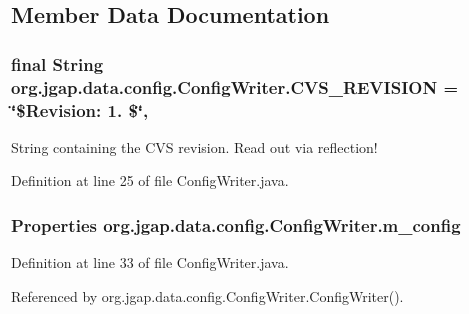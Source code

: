\subsection{Member Data Documentation}
\hypertarget{classorg_1_1jgap_1_1data_1_1config_1_1_config_writer_aacfdf9dc14ce9c848b420f51618c7a22}{
\subsubsection[{C\-V\-S\-\_\-\-R\-E\-V\-I\-S\-I\-O\-N}]{\setlength{\rightskip}{0pt plus 5cm}final String org.\-jgap.\-data.\-config.\-Config\-Writer.\-C\-V\-S\-\_\-\-R\-E\-V\-I\-S\-I\-O\-N = \char`\"{}\$Revision\-: 1. \$\char`\"{}\hspace{0.3cm}{\ttfamily [static]}, {\ttfamily [private]}}}\label{classorg_1_1jgap_1_1data_1_1config_1_1_config_writer_aacfdf9dc14ce9c848b420f51618c7a22}
String containing the C\-V\-S revision. Read out via reflection! 

Definition at line 25 of file Config\-Writer.\-java.

\hypertarget{classorg_1_1jgap_1_1data_1_1config_1_1_config_writer_a7b629715224163cac6980b147d852639}{
\subsubsection[{m\-\_\-config}]{\setlength{\rightskip}{0pt plus 5cm}Properties org.\-jgap.\-data.\-config.\-Config\-Writer.\-m\-\_\-config\hspace{0.3cm}{\ttfamily [private]}}}\label{classorg_1_1jgap_1_1data_1_1config_1_1_config_writer_a7b629715224163cac6980b147d852639}


Definition at line 33 of file Config\-Writer.\-java.



Referenced by org.\-jgap.\-data.\-config.\-Config\-Writer.\-Config\-Writer().

